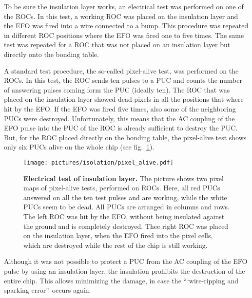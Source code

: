 To be sure the insulation layer works, an electrical test was performed on one of the \acs{ROC}s. In this test, a working \acs{ROC} was placed on the insulation layer and the \ac{EFO} was fired into a wire connected to a bump. This procedure was repeated in different \acs{ROC} positions where the \ac{EFO} was fired one to five times. The same test was repeated for a \acs{ROC} that was not placed on an insulation layer but directly onto the bonding table.

A standard test procedure, the so-called pixel-alive test, was performed on the \acs{ROC}s. In this test, the \acs{ROC} sends ten pulses to a \ac{PUC} and counts the number of answering pulses coming form the \ac{PUC} (ideally ten). The \acs{ROC} that was placed on the insulation layer showed dead pixels in all the positions that where hit by the \ac{EFO}. If the \ac{EFO} was fired five times, also some of the neighboring \ac{PUC}s were destroyed. Unfortunately, this means that the AC coupling of the \ac{EFO} pulse into the \ac{PUC} of the \acs{ROC} is already sufficient to destroy the \ac{PUC}. But, for the \acs{ROC} placed directly on the bonding table, the pixel-alive test shows only six \ac{PUC}s alive on the whole chip (see fig.~\ref{fig:electrical_insulation}).
\begin{figure}
\begin{center}
\texttt{[image: pictures/isolation/pixel\_alive.pdf]}
\end{center}
\caption[Electrical test of insulation layer]{\textbf{Electrical test of insulation layer.} The picture shows two pixel maps of pixel-alive tests, performed on \acs{ROC}s. Here, all red \ac{PUC}s answered on all the ten test pulses and are working, while the white \ac{PUC}s seem to be dead. All \ac{PUC}s are arranged in columns and rows. The left \acs{ROC} was hit by the \ac{EFO}, without being insulated against the ground and is completely destroyed. Thee right \acs{ROC} was placed on the insulation layer, when the \ac{EFO} fired into the pixel cells, which are destroyed while the rest of the chip is still working.}\label{fig:electrical_insulation}
\end{figure} 

Although it was not possible to protect a \ac{PUC} from the AC coupling of the \ac{EFO} pulse by using an insulation layer, the insulation prohibits the destruction of the entire chip. This allows minimizing the damage, in case the ```wire-ripping and sparking error'' occurs again.



